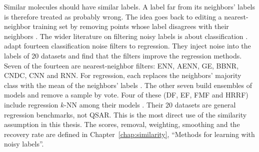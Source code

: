 %
Similar molecules should have similar labels. A label far from its neighbors' labels is therefore treated as probably wrong. The idea goes back to editing a nearest-neighbor training set by removing points whose label disagrees with their neighbors \citep{Wilson1972}. The wider literature on filtering noisy labels is about classification \citep{Brodley1999, frenay2014classification}. \citet{Martin2021} adapt fourteen classification noise filters to regression. They inject noise into the labels of 20 datasets and find that the filters improve the regression methods. Seven of the fourteen are nearest-neighbor filters: ENN, AENN, GE, BBNR, CNDC, CNN and RNN. For regression, each replaces the neighbors' majority class with the mean of the neighbors' labels \citep{Martin2021}. The other seven build ensembles of models and remove a sample by vote. Four of these (DF, EF, FMF and HRRF) include regression $k$-NN among their models \citep{Martin2021}. Their 20 datasets are general regression benchmarks, not QSAR.
This is the most direct use of the similarity assumption in this thesis. The scores, removal, weighting, smoothing and the recovery rate are defined in Chapter~\ref{chap:similarity}, ``Methods for learning with noisy labels''.

